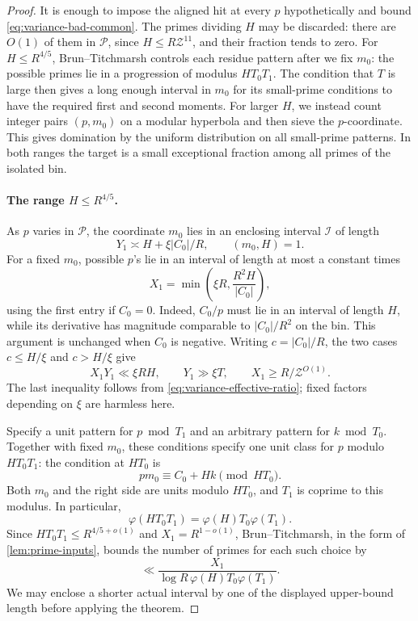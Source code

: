 \begin{proof}
It is enough to impose the aligned hit at every \(p\) hypothetically and
bound \eqref{eq:variance-bad-common}. The primes dividing \(H\) may be
discarded: there are \(O(1)\) of them in \(\mathcal P\), since
\(H\le R\mathcal Z^{11}\), and their fraction tends to zero.
For \(H\le R^{4/5}\), Brun--Titchmarsh controls each residue pattern
after we fix \(m_0\): the possible primes lie in a progression of
modulus \(HT_0T_1\). The condition that \(T\) is large then gives a
long enough interval in \(m_0\) for its small-prime conditions to have
the required first and second moments. For larger \(H\), we instead
count integer pairs \((p,m_0)\) on a modular hyperbola and then sieve
the \(p\)-coordinate. This gives domination by the uniform distribution
on all small-prime patterns. In both ranges the target is a small
exceptional fraction among all primes of the isolated bin.

\paragraph{The range \(H\le R^{4/5}\).}
As \(p\) varies in \(\mathcal P\), the coordinate \(m_0\) lies in an
enclosing interval \(\mathcal I\) of length
\begin{equation}\label{eq:variance-small-rectangle}
 Y_1\asymp H+\xi|C_0|/R,\qquad (m_0,H)=1.
\end{equation}
For a fixed \(m_0\), possible \(p\)'s lie in an interval of length at most
a constant times
\[
 X_1=\min\left(\xi R,\frac{R^2H}{|C_0|}\right),
\]
using the first entry if \(C_0=0\).
Indeed, \(C_0/p\) must lie in an interval of length \(H\), while its
derivative has magnitude comparable to \(|C_0|/R^2\) on the bin.
This argument is unchanged when \(C_0\) is negative.
Writing \(c=|C_0|/R\), the two cases \(c\le H/\xi\) and \(c>H/\xi\) give
\begin{equation}\label{eq:variance-small-area}
 X_1Y_1\ll\xi RH,\qquad
 Y_1\gg\xi T,\qquad
 X_1\ge R/\mathcal Z^{O(1)}.
\end{equation}
The last inequality follows from \eqref{eq:variance-effective-ratio};
fixed factors depending on \(\xi\) are harmless here.

Specify a unit pattern for \(p\bmod T_1\) and an arbitrary pattern for
\(k\bmod T_0\). Together with fixed \(m_0\), these conditions specify one
unit class for \(p\) modulo \(HT_0T_1\): the condition at \(HT_0\) is
\[
 pm_0\equiv C_0+Hk\pmod{HT_0}.
\]
Both \(m_0\) and the right side are units modulo \(HT_0\), and \(T_1\) is
coprime to this modulus. In particular,
\[
 \varphi(HT_0T_1)=\varphi(H)T_0\varphi(T_1).
\]
Since \(HT_0T_1\le R^{4/5+o(1)}\) and \(X_1=R^{1-o(1)}\),
Brun--Titchmarsh, in the form of \cref{lem:prime-inputs}, bounds the
number of primes for each such choice by
\begin{equation}\label{eq:variance-bt}
 \ll\frac{X_1}{\log R\,\varphi(H)T_0\varphi(T_1)}.
\end{equation}
We may enclose a shorter actual interval by one of the displayed
upper-bound length before applying the theorem.


\end{proof}
